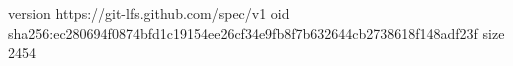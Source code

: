 version https://git-lfs.github.com/spec/v1
oid sha256:ec280694f0874bfd1c19154ee26cf34e9fb8f7b632644cb2738618f148adf23f
size 2454
